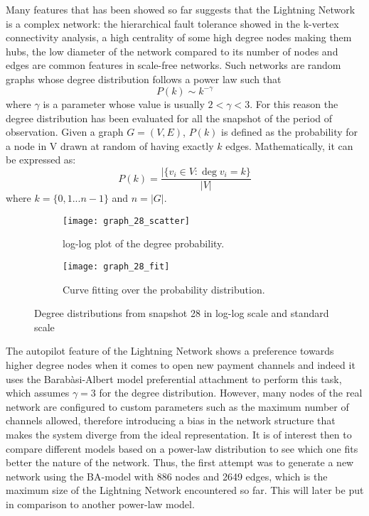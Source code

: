 	Many features that has been showed so far suggests that the Lightning Network is a complex network: the hierarchical fault tolerance showed in the k-vertex connectivity analysis, a high centrality of some high degree nodes making them hubs, the low diameter of the network compared to its number of nodes and edges are common features in scale-free networks. Such networks are random graphs whose degree distribution follows a power law such that 
	$$P(k) \sim k^{-\gamma}$$
	where $\gamma$ is a parameter whose value is usually $2 < \gamma < 3$. For this reason the degree distribution has been evaluated for all the snapshot of the period of observation. Given a graph $G = (V,E)$, $P(k)$ is defined as the probability for a node in V drawn at random of having exactly $k$ edges. Mathematically, it can be expressed as:
	$$P(k) = \frac{|\{ v_i \in V : \deg v_i = k \}}{|V|}$$
	where $k = \{0,1 ... n - 1\}$ and $n = |G|$. 
	
	\begin{figure}
	\centering
	\begin{subfigure}{\textwidth}
		\centering
		\texttt{[image: graph\_28\_scatter]}
		\caption{log-log plot of the degree probability.}
		\label{graph_28_scatter}
	\end{subfigure}
	\begin{subfigure}{\textwidth}
		\centering
		\texttt{[image: graph\_28\_fit]}
		\caption{Curve fitting over the probability distribution.}
		\label{graph_28_degree}
	\end{subfigure}
		\caption{Degree distributions from snapshot 28 in log-log scale and standard scale}
	\end{figure}
	
	The autopilot feature of the Lightning Network shows a preference towards higher degree nodes when it comes to open new payment channels and indeed it uses the Barabàsi-Albert model preferential attachment to perform this task, which assumes $\gamma=3$ for the degree distribution. However, many nodes of the real network are configured to custom parameters such as the maximum number of channels allowed, therefore introducing a bias in the network structure that makes the system diverge from the ideal representation. It is of interest then to compare different models based on a power-law distribution to see which one fits better the nature of the network. Thus, the first attempt was to generate a new network using the BA-model with 886 nodes and 2649 edges, which is the maximum size of the Lightning Network encountered so far. This will later be put in comparison to another power-law model.
	
